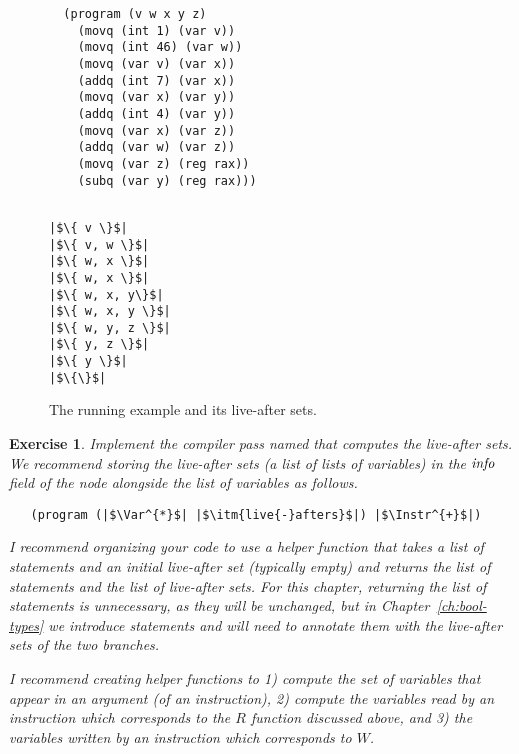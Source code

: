 \documentclass[11pt]{book}
\newtheorem{exercise}[theorem]{Exercise}
\begin{document}
\begin{figure}[tbp]
\hspace{20pt}
\begin{minipage}{0.45\textwidth}
\begin{lstlisting}
  (program (v w x y z)
    (movq (int 1) (var v))
    (movq (int 46) (var w))
    (movq (var v) (var x))
    (addq (int 7) (var x))
    (movq (var x) (var y))
    (addq (int 4) (var y))
    (movq (var x) (var z))
    (addq (var w) (var z))
    (movq (var z) (reg rax))
    (subq (var y) (reg rax)))
\end{lstlisting}
\end{minipage}
\vrule\hspace{10pt}
\begin{minipage}{0.45\textwidth}
\begin{lstlisting}

|$\{ v \}$|
|$\{ v, w \}$|
|$\{ w, x \}$|
|$\{ w, x \}$|
|$\{ w, x, y\}$|
|$\{ w, x, y \}$|
|$\{ w, y, z \}$|
|$\{ y, z \}$|
|$\{ y \}$|
|$\{\}$|
\end{lstlisting}
\end{minipage}

\caption{The running example and its live-after sets.}
\label{fig:live-eg}
\end{figure}

\begin{exercise}\normalfont
Implement the compiler pass named  that computes
the live-after sets. We recommend storing the live-after sets (a list
of lists of variables) in the $\mathit{info}$ field of the 
node alongside the list of variables as follows.
\begin{lstlisting}
   (program (|$\Var^{*}$| |$\itm{live{-}afters}$|) |$\Instr^{+}$|)
\end{lstlisting}
I recommend organizing your code to use a helper function that takes a
list of statements and an initial live-after set (typically empty) and
returns the list of statements and the list of live-after sets.  For
this chapter, returning the list of statements is unnecessary, as they
will be unchanged, but in Chapter~\ref{ch:bool-types} we introduce
 statements and will need to annotate them with the live-after
sets of the two branches.

I recommend creating helper functions to 1) compute the set of
variables that appear in an argument (of an instruction), 2) compute
the variables read by an instruction which corresponds to the $R$
function discussed above, and 3) the variables written by an
instruction which corresponds to $W$.
\end{exercise}
\end{document}
